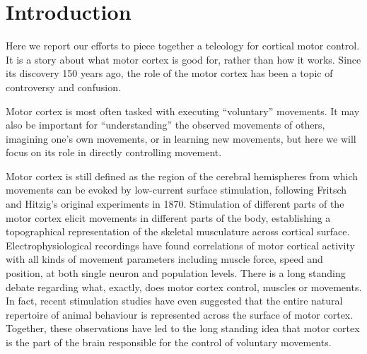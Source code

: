 \section{Introduction}

Here we report our efforts to piece together a teleology for cortical motor control. It is a story about what motor cortex is good for, rather than how it works. Since its discovery 150 years ago, the role of the motor cortex has been a topic of controversy and confusion.

Motor cortex is most often tasked with executing “voluntary” movements. It may also be important for “understanding” the observed movements of others, imagining one’s own movements, or in learning new movements, but here we will focus on its role in directly controlling movement.

Motor cortex is still defined as the region of the cerebral hemispheres from which movements can be evoked by low-current surface stimulation, following Fritsch and Hitzig's original experiments in 1870. Stimulation of different parts of the motor cortex elicit movements in different parts of the body, establishing a topographical representation of the skeletal musculature across cortical surface. Electrophysiological recordings have found correlations of motor cortical activity with all kinds of movement parameters including muscle force, speed and position, at both single neuron and population levels. There is a long standing debate regarding what, exactly, does motor cortex control, muscles or movements. In fact, recent stimulation studies have even suggested that the entire natural repertoire of animal behaviour is represented across the surface of motor cortex. Together, these observations have led to the long standing idea that motor cortex is the part of the brain responsible for the control of voluntary movements.

